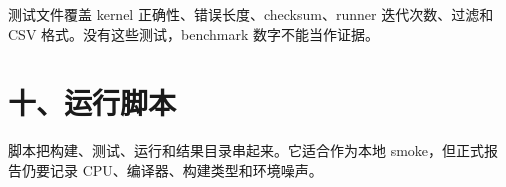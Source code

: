 测试文件覆盖 kernel 正确性、错误长度、checksum、runner 迭代次数、过滤和 CSV 格式。没有这些测试，benchmark 数字不能当作证据。



\section{十、运行脚本}

脚本把构建、测试、运行和结果目录串起来。它适合作为本地 smoke，但正式报告仍要记录 CPU、编译器、构建类型和环境噪声。


